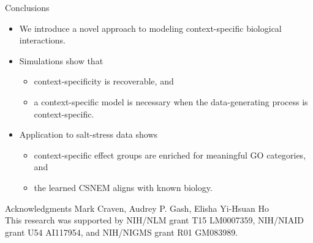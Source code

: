 \documentclass[aspectratio=169]{beamer}
\begin{document}
\begin{frame}{Conclusions}
 \begin{itemize}
  \item We introduce a novel approach to modeling context-specific biological interactions.
  \pause
  \item Simulations show that
  \begin{itemize}
   \item context-specificity is recoverable, and
   \item a context-specific model is necessary when the data-generating process is context-specific.
  \end{itemize}
  \item Application to salt-stress data shows
  \begin{itemize}
   \item context-specific effect groups are enriched for meaningful GO categories, and
   \item the learned CSNEM aligns with known biology.
  \end{itemize}
 \end{itemize}
 \pause
 \begin{block}{Acknowledgments}
   Mark Craven, Audrey P. Gash, Elisha Yi-Hsuan Ho \\
   \scriptsize
   \color{UWRed}
   This research was supported by NIH/NLM grant T15 LM0007359, NIH/NIAID grant U54 AI117954, and NIH/NIGMS grant R01 GM083989.
 \end{block}
\end{frame}
\end{document}
